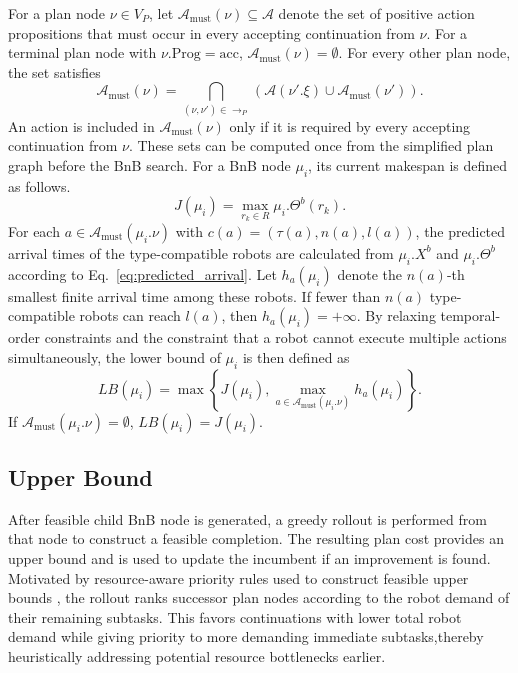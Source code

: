 \documentclass[lettersize,journal]{IEEEtran}
\theoremstyle{italiclemma}
\theoremstyle{italiclemma}
\theoremstyle{definition}
\begin{document}
For a plan node $\nu\in V_P$, let
$\mathcal A_{\mathrm{must}}(\nu)\subseteq\mathcal A$ denote the set of positive action propositions that must occur in every accepting continuation from $\nu$. For a terminal plan node with $\nu.\mathrm{Prog}=\mathrm{acc}$,
$\mathcal A_{\mathrm{must}}(\nu)=\emptyset$. For every other plan node, the set satisfies
\begin{equation}
\mathcal A_{\mathrm{must}}(\nu) =
\bigcap_{(\nu,\nu')\in \rightarrow_P}
\left( \mathcal A(\nu'.\xi) \cup \mathcal A_{\mathrm{must}}(\nu') \right).
\label{eq:must_actions}
\end{equation}
An action is included in $\mathcal A_{\mathrm{must}}(\nu)$ only if it is required by every accepting continuation from $\nu$. These sets can be computed once from the simplified plan graph before the BnB search. For a BnB node $\mu_i$, its current makespan is defined as follows.
\begin{equation}
J(\mu_i)
=
\max_{r_k\in R}\mu_i.\Theta^b(r_k).
\label{eq:bnb_current_cost}
\end{equation}
For each $a\in\mathcal A_{\mathrm{must}}(\mu_i.\nu)$ with
$c(a)=(\tau(a),n(a),l(a))$, the predicted arrival times of the type-compatible robots are calculated from
$\mu_i.X^b$ and $\mu_i.\Theta^b$ according to
Eq.~\eqref{eq:predicted_arrival}. Let $h_a(\mu_i)$ denote the $n(a)$-th smallest finite arrival time among these robots. If fewer than $n(a)$ type-compatible robots can reach $l(a)$, then $h_a(\mu_i)=+\infty$. By relaxing temporal-order constraints and the constraint that a robot cannot execute multiple actions simultaneously, the lower bound of $\mu_i$ is then defined as
\begin{equation}
LB(\mu_i)
=
\max
\left\{
J(\mu_i),
\max_{a\in\mathcal A_{\mathrm{must}}(\mu_i.\nu)}
h_a(\mu_i)
\right\}.
\label{eq:bnb_lower_bound}
\end{equation}
If $\mathcal A_{\mathrm{must}}(\mu_i.\nu)=\emptyset$, $LB(\mu_i)=J(\mu_i)$.



\subsection{Upper Bound}

After feasible child BnB node is generated, a greedy rollout is performed from that node to construct a feasible completion. The resulting plan cost provides an upper bound and is used to update the incumbent if an improvement is found. Motivated by resource-aware priority rules used to construct feasible upper bounds \cite{Brucker1998RCPSP,Liu2023BnB}, the rollout ranks successor plan nodes according to the robot demand of their remaining subtasks. This favors continuations with lower total robot demand while giving priority to more demanding immediate subtasks,thereby heuristically addressing potential resource bottlenecks earlier.
\end{document}
